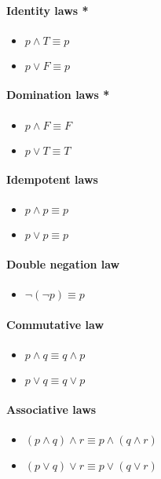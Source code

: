 \documentclass[12pt,a4paper]{article}
\begin{document}
\paragraph{Identity laws *}
\begin{itemize}
    \item $p \land T \equiv p $
    \item $p \lor F \equiv p $
\end{itemize}

\paragraph{Domination laws *}
\begin{itemize}
    \item $p \land F \equiv F$
    \item $p \lor T \equiv T$
\end{itemize}

\paragraph{Idempotent laws}
\begin{itemize}
    \item $p \land p \equiv p$
    \item $p \lor p \equiv p$
\end{itemize}

\paragraph{Double negation law}
\begin{itemize}
    \item $\neg(\neg p) \equiv p$
\end{itemize}

\paragraph{Commutative law}
\begin{itemize}
    \item $p\land q \equiv q \land p$
    \item $p \lor q \equiv q \lor p$
\end{itemize}

\paragraph{Associative laws}
\begin{itemize}
    \item $(p \land q) \land r \equiv p \land (q \land r)$
    \item $(p \lor q) \lor r \equiv p \lor (q \lor r)$
\end{itemize}
\end{document}
